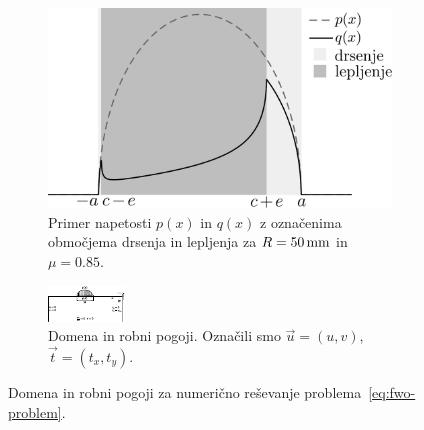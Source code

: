 \documentclass[12pt,a4paper,twoside]{article}
\theoremstyle{definition} %
\theoremstyle{plain} %
\numberwithin{equation}{section}
\newcommand{\vt}{\vec{t}}
\newcommand{\vu}{\vec{u}}
\begin{document}
\begin{figure}[!h]
  \centering
  \begin{subfigure}[t]{0.45\textwidth}
    \includegraphics[width=\textwidth]{images/fwo_sample_pq.pdf}
    \caption[Primer napetosti $p(x)$ in $q(x)$.]{Primer napetosti $p(x)$ in $q(x)$ z označenima območjema drsenja in lepljenja za $R =
    \unit[50]{mm}$ in $\mu = 0.85$.}
    \label{fig:fwo-pq-example}
  \end{subfigure}
  \hspace{10pt}
  \begin{subfigure}[t]{0.45\textwidth}
    \includegraphics[width=\textwidth]{images/fwo_bc.pdf}
    \caption[Domena in robni pogoji.]{Domena in robni pogoji. Označili smo $\vu = (u, v)$, $\vt = (t_x, t_y)$.}
    \label{fig:fwo-bc}
  \end{subfigure}
  \caption{Domena in robni pogoji za numerično reševanje problema~\eqref{eq:fwo-problem}.}
  \label{fig:fwo-setup}
\end{figure}
\end{document}
